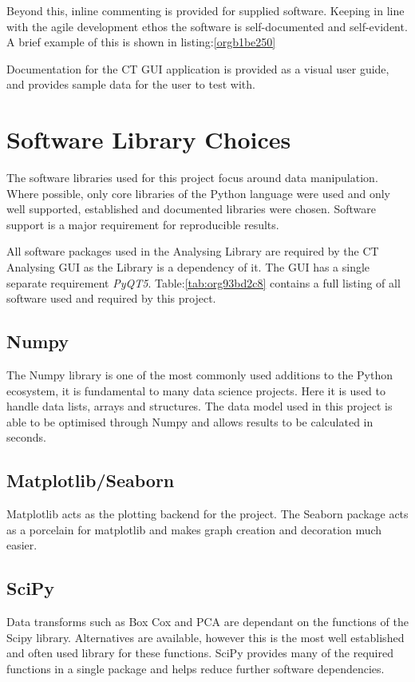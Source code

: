 \documentclass[11pt]{report}
\begin{document}
Beyond this, inline commenting is provided for supplied software. Keeping in line with the agile development ethos the software is self-documented and self-evident. A brief example of this is shown in listing:\ref{orgb1be250}

Documentation for the CT GUI application is provided as a visual user guide, and provides sample data for the user to test with.
\section{Software Library Choices}
\label{sec:org6f39099}
The software libraries used for this project focus around data manipulation. Where possible, only core libraries of the Python language were used and only well supported, established and documented libraries were chosen. Software support is a major requirement for reproducible results.

All software packages used in the Analysing Library are required by the CT Analysing GUI as the Library is a dependency of it. The GUI has a single separate requirement \emph{PyQT5}.
Table:\ref{tab:org93bd2c8} contains a full listing of all software used and required by this project.
\subsection{Numpy}
\label{sec:org60e66d3}
The Numpy library is one of the most commonly used additions to the Python ecosystem, it is fundamental to many data science projects. Here it is used to handle data lists, arrays and structures. The data model used in this project is able to be optimised through Numpy and allows results to be calculated in seconds.
\subsection{Matplotlib/Seaborn}
\label{sec:org52aeb6d}
Matplotlib acts as the plotting backend for the project. The Seaborn package acts as a porcelain for matplotlib and makes graph creation and decoration much easier.
\subsection{SciPy}
\label{sec:org00146d3}
Data transforms such as Box Cox and PCA are dependant on the functions of the Scipy library. Alternatives are available, however this is the most well established and often used library for these functions. SciPy provides many of the required functions in a single package and helps reduce further software dependencies.
\end{document}
